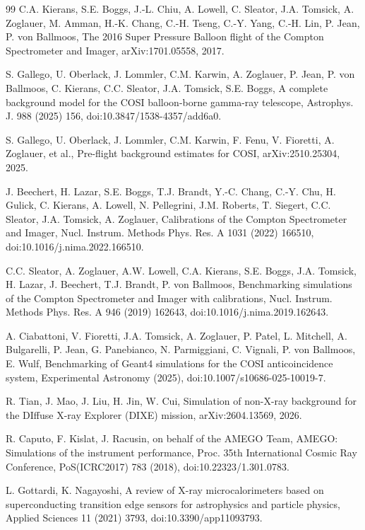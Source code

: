 \documentclass[11pt]{article}
\begin{document}
\begin{thebibliography}{99}
C.A. Kierans, S.E. Boggs, J.-L. Chiu, A. Lowell, C. Sleator, J.A. Tomsick, A. Zoglauer, M. Amman, H.-K. Chang, C.-H. Tseng, C.-Y. Yang, C.-H. Lin, P. Jean, P. von Ballmoos, The 2016 Super Pressure Balloon flight of the Compton Spectrometer and Imager, arXiv:1701.05558, 2017.

S. Gallego, U. Oberlack, J. Lommler, C.M. Karwin, A. Zoglauer, P. Jean, P. von Ballmoos, C. Kierans, C.C. Sleator, J.A. Tomsick, S.E. Boggs, A complete background model for the COSI balloon-borne gamma-ray telescope, Astrophys. J. 988 (2025) 156, doi:10.3847/1538-4357/add6a0.

S. Gallego, U. Oberlack, J. Lommler, C.M. Karwin, F. Fenu, V. Fioretti, A. Zoglauer, et al., Pre-flight background estimates for COSI, arXiv:2510.25304, 2025.

J. Beechert, H. Lazar, S.E. Boggs, T.J. Brandt, Y.-C. Chang, C.-Y. Chu, H. Gulick, C. Kierans, A. Lowell, N. Pellegrini, J.M. Roberts, T. Siegert, C.C. Sleator, J.A. Tomsick, A. Zoglauer, Calibrations of the Compton Spectrometer and Imager, Nucl. Instrum. Methods Phys. Res. A 1031 (2022) 166510, doi:10.1016/j.nima.2022.166510.

C.C. Sleator, A. Zoglauer, A.W. Lowell, C.A. Kierans, S.E. Boggs, J.A. Tomsick, H. Lazar, J. Beechert, T.J. Brandt, P. von Ballmoos, Benchmarking simulations of the Compton Spectrometer and Imager with calibrations, Nucl. Instrum. Methods Phys. Res. A 946 (2019) 162643, doi:10.1016/j.nima.2019.162643.

A. Ciabattoni, V. Fioretti, J.A. Tomsick, A. Zoglauer, P. Patel, L. Mitchell, A. Bulgarelli, P. Jean, G. Panebianco, N. Parmiggiani, C. Vignali, P. von Ballmoos, E. Wulf, Benchmarking of Geant4 simulations for the COSI anticoincidence system, Experimental Astronomy (2025), doi:10.1007/s10686-025-10019-7.

R. Tian, J. Mao, J. Liu, H. Jin, W. Cui, Simulation of non-X-ray background for the DIffuse X-ray Explorer (DIXE) mission, arXiv:2604.13569, 2026.

R. Caputo, F. Kislat, J. Racusin, on behalf of the AMEGO Team, AMEGO: Simulations of the instrument performance, Proc. 35th International Cosmic Ray Conference, PoS(ICRC2017) 783 (2018), doi:10.22323/1.301.0783.

L. Gottardi, K. Nagayoshi, A review of X-ray microcalorimeters based on superconducting transition edge sensors for astrophysics and particle physics, Applied Sciences 11 (2021) 3793, doi:10.3390/app11093793.


\end{thebibliography}
\end{document}
